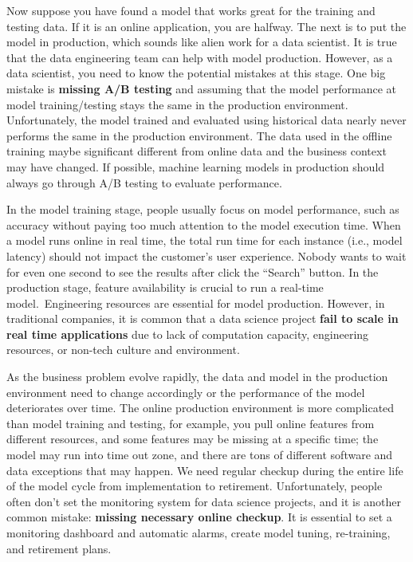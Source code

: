 \documentclass[12pt,]{krantz}
\begin{document}
Now suppose you have found a model that works great for the training and testing data. If it is an online application, you are halfway. The next is to put the model in production, which sounds like alien work for a data scientist. It is true that the data engineering team can help with model production. However, as a data scientist, you need to know the potential mistakes at this stage. One big mistake is \textbf{missing A/B testing} and assuming that the model performance at model training/testing stays the same in the production environment. Unfortunately, the model trained and evaluated using historical data nearly never performs the same in the production environment. The data used in the offline training maybe significant different from online data and the business context may have changed. If possible, machine learning models in production should always go through A/B testing to evaluate performance.

In the model training stage, people usually focus on model performance, such as accuracy without paying too much attention to the model execution time. When a model runs online in real time, the total run time for each instance (i.e., model latency) should not impact the customer's user experience. Nobody wants to wait for even one second to see the results after click the ``Search'' button. In the production stage, feature availability is crucial to run a real-time model.~Engineering resources are essential for model production. However, in traditional companies, it is common that a data science project \textbf{fail to scale in real time applications} due to lack of computation capacity, engineering resources, or non-tech culture and environment.

As the business problem evolve rapidly, the data and model in the production environment need to change accordingly or the performance of the model deteriorates over time. The online production environment is more complicated than model training and testing, for example, you pull online features from different resources, and some features may be missing at a specific time; the model may run into time out zone, and there are tons of different software and data exceptions that may happen. We need regular checkup during the entire life of the model cycle from implementation to retirement. Unfortunately, people often don't set the monitoring system for data science projects, and it is another common mistake: \textbf{missing necessary online checkup}. It is essential to set a monitoring dashboard and automatic alarms, create model tuning, re-training, and retirement plans.
\end{document}
